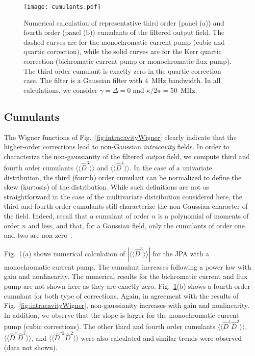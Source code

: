 \documentclass[pra,twocolumn,superscriptaddress]{revtex4-1}
\newcommand{\cumulant}[1]{\langle \! \langle #1\rangle\! \rangle}
\begin{document}
\begin{figure}[tb]
	\texttt{[image: cumulants.pdf]}
	\caption{
		Numerical calculation of representative third order (panel (a)) and fourth order (panel (b)) cumulants of the filtered output field. The dashed curves are for the monochromatic current pump (cubic and quartic correction), while the solid curves are for the Kerr quartic correction (bichromatic current pump  or monochromatic flux pump). The third order cumulant is exactly zero in the quartic correction case.
		The filter is a Gaussian filter with 4~MHz bandwidth. In all calculations, we consider $\gamma = \Delta = 0$ and $\kappa/2\pi = 50$~MHz.
	}
	\label{fig:cumulants}
\end{figure}

\subsection{Cumulants}
% 
The Wigner functions of Fig.~\ref{fig:intracavityWigner} clearly indicate that the higher-order corrections lead to non-Gaussian \emph{intracavity} fields. 
In order to characterize the non-gaussianity of the filtered \emph{output} field, we  compute third and fourth order cumulants $\cumulant{\hat D^3}$ and $\cumulant{\hat D^4}$.
In the case of a univariate distribution, the third (fourth) order cumulant can be normalized to define the skew (kurtosis) of the distribution. While such definitions are not as straightforward in the case of the multivariate distribution considered here, the third and fourth order cumulants still characterize the non-Gaussian character of the field.
Indeed, recall that a cumulant of order $n$ is a polynomial of moments of order $n$ and less, and that, for a Gaussian field, only the cumulants of order one and two are non-zero~\cite{Puri:2001kx}. 


Fig.~\ref{fig:cumulants}(a) shows numerical calculation of $|\cumulant{\hat D^3}|$ for the JPA with a monochromatic current pump. The cumulant increases following a power law with gain and nonlinearity. The numerical results for the bichromatic current and flux pump are not shown here as they are exactly zero. 
% 	
Fig.~\ref{fig:cumulants}(b) shows a fourth order cumulant for both type of corrections. Again, in agreement with the results of Fig.~\ref{fig:intracavityWigner}, non-gaussianity increases with gain and nonlinearity. In addition, we observe that the slope is larger for the monochromatic current pump (cubic corrections).
The other third and fourth order cumulants $\cumulant{\hat D^\dag \hat D^2}$, $\cumulant{\hat D^\dag  \hat D^3}$, and $\cumulant{\hat D^{\dag 2}\hat D^2}$ were also calculated and similar trends were observed (data not shown).
\end{document}
